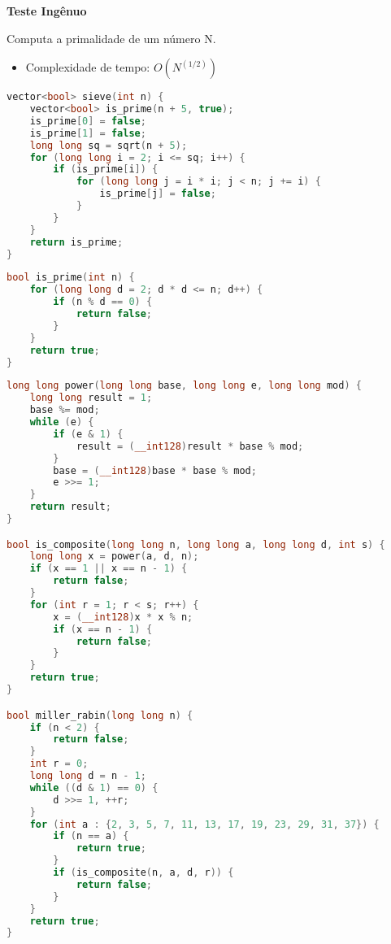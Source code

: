 \documentclass[11pt, a4paper, oneside]{book}
\begin{document}
\textbf{Teste Ingênuo} 

Computa a primalidade de um número N.



\begin{itemize}
\item Complexidade de tempo: $O(N^(1/2))$
\end{itemize}

\hfill

\begin{multicols}{2}
\begin{lstlisting}[language=C++]
vector<bool> sieve(int n) {
    vector<bool> is_prime(n + 5, true);
    is_prime[0] = false;
    is_prime[1] = false;
    long long sq = sqrt(n + 5);
    for (long long i = 2; i <= sq; i++) {
        if (is_prime[i]) {
            for (long long j = i * i; j < n; j += i) {
                is_prime[j] = false;
            }
        }
    }
    return is_prime;
}
\end{lstlisting}
\end{multicols}

\hfill

\begin{multicols}{2}
\begin{lstlisting}[language=C++]
bool is_prime(int n) {
    for (long long d = 2; d * d <= n; d++) {
        if (n % d == 0) {
            return false;
        }
    }
    return true;
}
\end{lstlisting}
\end{multicols}

\hfill

\begin{multicols}{2}
\begin{lstlisting}[language=C++]
long long power(long long base, long long e, long long mod) {
    long long result = 1;
    base %= mod;
    while (e) {
        if (e & 1) {
            result = (__int128)result * base % mod;
        }
        base = (__int128)base * base % mod;
        e >>= 1;
    }
    return result;
}

bool is_composite(long long n, long long a, long long d, int s) {
    long long x = power(a, d, n);
    if (x == 1 || x == n - 1) {
        return false;
    }
    for (int r = 1; r < s; r++) {
        x = (__int128)x * x % n;
        if (x == n - 1) {
            return false;
        }
    }
    return true;
}

bool miller_rabin(long long n) {
    if (n < 2) {
        return false;
    }
    int r = 0;
    long long d = n - 1;
    while ((d & 1) == 0) {
        d >>= 1, ++r;
    }
    for (int a : {2, 3, 5, 7, 11, 13, 17, 19, 23, 29, 31, 37}) {
        if (n == a) {
            return true;
        }
        if (is_composite(n, a, d, r)) {
            return false;
        }
    }
    return true;
}
\end{lstlisting}
\end{multicols}
\end{document}
